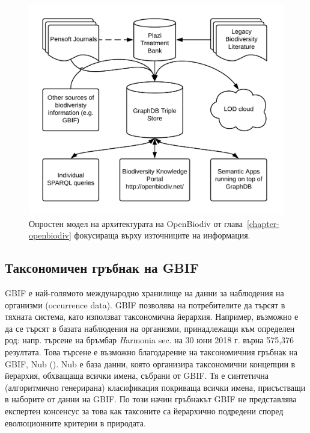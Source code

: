\begin{figure}
\centering
\includegraphics[width=\textwidth]{Figures/openbiodiv-sources-simple}
\decoRule
\caption{Опростен модел на архитектурата на OpenBiodiv от глава~\ref{chapter-openbiodiv} фокусираща върху източниците на информация.}
\label{fig:openbiodiv-sources-simple}
\end{figure}


\subsection{Таксономичен гръбнак на GBIF}

GBIF е най-голямото международно хранилище на данни за наблюдения на организми (occurrence data). GBIF позволява на потребителите да търсят в тяхната система, като използват таксономична йерархия. Например, възможно е да се търсят в базата наблюдения на организми, принадлежащи към определен род: напр. търсене на бръмбар {\textit Harmonia} sec. \cite{gbif_secretariat_gbif_2017} на 30 юни 2018 г. върна 575,376 резултата. Това търсене е възможно благодарение на таксономичния гръбнак на GBIF, Nub (\cite{gbif_secretariat_gbif_2017}). Nub е база данни, която организира таксономични концепции в йерархия, обхващаща всички имена, събрани от GBIF. Тя е синтетична (алгоритмично генерирана) класификация покриваща всички имена, присъстващи в наборите от данни на GBIF. По този начин гръбнакът GBIF не представлява експертен консенсус за това как таксоните са йерархично подредени според еволюционните критерии в природата.

